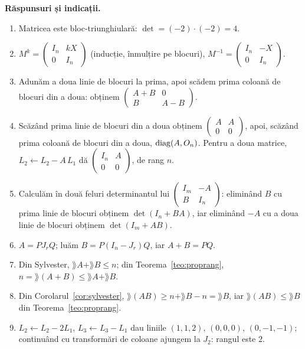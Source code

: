 \medskip\noindent\textbf{Răspunsuri și indicații.}
\begin{enumerate}[label=\textbf{\arabic*.},leftmargin=*]
\item Matricea este bloc-triunghiulară: $\det=(-2)\cdot(-2)=4$.
\item $M^k=\begin{pmatrix}I_n&kX\\0&I_n\end{pmatrix}$ (inducție, înmulțire pe blocuri), $M^{-1}=\begin{pmatrix}I_n&-X\\0&I_n\end{pmatrix}$.
\item Adunăm a doua linie de blocuri la prima, apoi scădem prima coloană de blocuri din a doua: obținem $\begin{pmatrix}A+B&0\\B&A-B\end{pmatrix}$.
\item Scăzând prima linie de blocuri din a doua obținem $\begin{pmatrix}A&A\\0&0\end{pmatrix}$, apoi, scăzând prima coloană de blocuri din a doua, $\operatorname{diag}(A,O_n)$. Pentru a doua matrice, $L_2\leftarrow L_2-A\,L_1$ dă $\begin{pmatrix}I_n&A\\0&0\end{pmatrix}$, de rang $n$.
\item Calculăm în două feluri determinantul lui $\begin{pmatrix}I_m&-A\\B&I_n\end{pmatrix}$: eliminând $B$ cu prima linie de blocuri obținem $\det(I_n+BA)$, iar eliminând $-A$ cu a doua linie de blocuri obținem $\det(I_m+AB)$.
\item $A=PJ_rQ$; luăm $B=P(I_n-J_r)Q$, iar $A+B=PQ$.
\item Din Sylvester, $\rang A+\rang B\le n$; din Teorema~\ref{teo:proprang}, $n=\rang(A+B)\le\rang A+\rang B$.
\item Din Corolarul~\ref{cor:sylvester}, $\rang(AB)\ge n+\rang B-n=\rang B$, iar $\rang(AB)\le\rang B$ din Teorema~\ref{teo:proprang}.
\item $L_2\leftarrow L_2-2L_1$, $L_3\leftarrow L_3-L_1$ dau liniile $(1,1,2)$, $(0,0,0)$, $(0,-1,-1)$; continuând cu transformări de coloane ajungem la $J_2$: rangul este $2$.
\end{enumerate}

